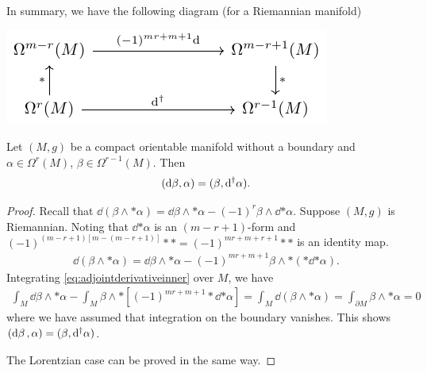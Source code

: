 \documentclass[10pt]{article}
\begin{document}
In summary, we have the following diagram (for a Riemannian manifold)
        \begin{center}
            \includegraphics{figures/riemannian geometry/commutative/fig.pdf}
        \end{center}
\begin{theorem}
    Let $(M,g)$ be a compact orientable manifold without a boundary and $\alpha\in\Omega^r(M)$, $\beta\in\Omega^{r-1}(M)$.
    Then
    \begin{align}
        (\mathrm{d} \beta,\alpha)=(\beta,\mathrm{d}^\dagger \alpha).
    \end{align}
\end{theorem}
\begin{proof}
    Recall that $\dd(\beta\wedge\ast\alpha)=\dd{\beta}\wedge\ast\alpha-(-1)^r \beta\wedge\dd{\ast\alpha}$.
    Suppose $(M,g)$ is Riemannian.
    Noting that $\dd{\ast\alpha}$ is an $(m-r+1)$-form and $(-1)^{(m-r+1)[m-(m-r+1)]}\ast\ast=(-1)^{mr+m+r+1}\ast\ast$ is an identity map.
    \begin{align}\label{eq:adjointderivativeinner}
        \dd(\beta\wedge\ast\alpha)=\dd{\beta}\wedge\ast\alpha-(-1)^{mr+m+1}\beta\wedge\ast(\ast\dd{\ast\alpha}).
    \end{align}
    Integrating \eqref{eq:adjointderivativeinner} over $M$, we have 
    \begin{align}
        \int_M\dd{\beta}\wedge\ast\alpha-\int_M \beta\wedge\ast[(-1)^{mr+m+1}\ast\dd{\ast\alpha}]=\int_M\dd(\beta\wedge\ast\alpha)=\int_{\partial M}\beta\wedge\ast\alpha=0
    \end{align}
    where we have assumed that integration on the boundary vanishes.
    This shows $(\dd{\beta},\alpha)=(\beta,\mathrm{d}^\dagger\alpha)$.

    The Lorentzian case can be proved in the same way.
\end{proof}
\end{document}
